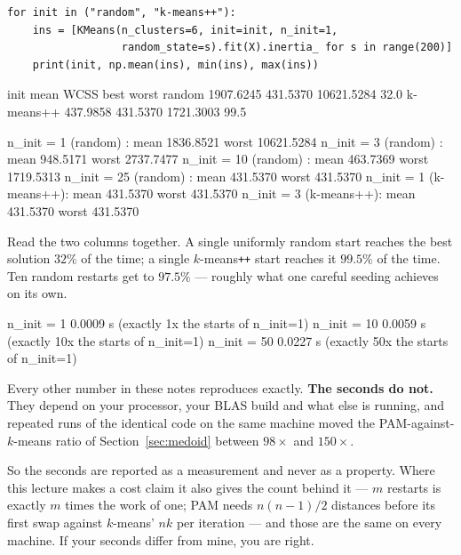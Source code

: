 \documentclass[11pt]{article}
\begin{document}
\begin{lstlisting}
for init in ("random", "k-means++"):
    ins = [KMeans(n_clusters=6, init=init, n_init=1,
                  random_state=s).fit(X).inertia_ for s in range(200)]
    print(init, np.mean(ins), min(ins), max(ins))
\end{lstlisting}
\begin{codeout}
  init         mean WCSS    best      worst   %
  random      1907.6245  431.5370 10621.5284      32.0
  k-means++    437.9858  431.5370  1721.3003      99.5

  n_init =  1 (random)   : mean 1836.8521   worst 10621.5284   %
  n_init =  3 (random)   : mean  948.5171   worst  2737.7477   %
  n_init = 10 (random)   : mean  463.7369   worst  1719.5313   %
  n_init = 25 (random)   : mean  431.5370   worst   431.5370   %
  n_init =  1 (k-means++): mean  431.5370   worst   431.5370   %
  n_init =  3 (k-means++): mean  431.5370   worst   431.5370   %
\end{codeout}

Read the two columns together. A single uniformly random start reaches the
best solution $32\%$ of the time; a single $k$-means\texttt{++} start reaches
it $99.5\%$ of the time. Ten random restarts get to $97.5\%$ --- roughly what
one careful seeding achieves on its own.

\begin{codeout}
  n_init =  1  0.0009 s   (exactly  1x the starts of n_init=1)
  n_init = 10  0.0059 s   (exactly 10x the starts of n_init=1)
  n_init = 50  0.0227 s   (exactly 50x the starts of n_init=1)
\end{codeout}

\begin{caution}
Every other number in these notes reproduces exactly. \textbf{The seconds do
not.} They depend on your processor, your BLAS build and what else is running,
and repeated runs of the identical code on the same machine moved the
PAM-against-$k$-means ratio of Section~\ref{sec:medoid} between $98\times$ and
$150\times$.

So the seconds are reported as a measurement and never as a property. Where
this lecture makes a cost claim it also gives the count behind it --- $m$
restarts is exactly $m$ times the work of one; PAM needs $n(n-1)/2$ distances
before its first swap against $k$-means' $nk$ per iteration --- and those are
the same on every machine. If your seconds differ from mine, you are right.
\end{caution}
\end{document}
